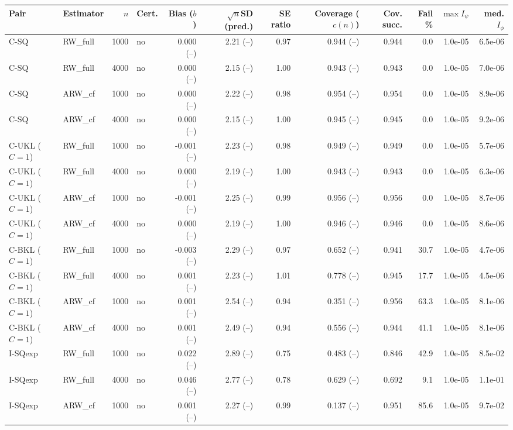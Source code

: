 \begin{tabular}{llrlrrrrrrrr}
\hline
Pair & Estimator & $n$ & Cert. & Bias ($b$) & $\sqrt{n}$SD (pred.) & SE ratio & Coverage ($c(n)$) & Cov. succ. & Fail \% & $\max I_\psi$ & med. $I_\phi$ \\
\hline
C-SQ & RW\_full & 1000 & no & 0.000 (--) & 2.21 (--) & 0.97 & 0.944 (--) & 0.944 & 0.0 & 1.0e-05 & 6.5e-06 \\
C-SQ & RW\_full & 4000 & no & 0.000 (--) & 2.15 (--) & 1.00 & 0.943 (--) & 0.943 & 0.0 & 1.0e-05 & 7.0e-06 \\
C-SQ & ARW\_cf & 1000 & no & 0.000 (--) & 2.22 (--) & 0.98 & 0.954 (--) & 0.954 & 0.0 & 1.0e-05 & 8.9e-06 \\
C-SQ & ARW\_cf & 4000 & no & 0.000 (--) & 2.15 (--) & 1.00 & 0.945 (--) & 0.945 & 0.0 & 1.0e-05 & 9.2e-06 \\
C-UKL ($C=1$) & RW\_full & 1000 & no & -0.001 (--) & 2.23 (--) & 0.98 & 0.949 (--) & 0.949 & 0.0 & 1.0e-05 & 5.7e-06 \\
C-UKL ($C=1$) & RW\_full & 4000 & no & 0.000 (--) & 2.19 (--) & 1.00 & 0.943 (--) & 0.943 & 0.0 & 1.0e-05 & 6.3e-06 \\
C-UKL ($C=1$) & ARW\_cf & 1000 & no & -0.001 (--) & 2.25 (--) & 0.99 & 0.956 (--) & 0.956 & 0.0 & 1.0e-05 & 8.7e-06 \\
C-UKL ($C=1$) & ARW\_cf & 4000 & no & 0.000 (--) & 2.19 (--) & 1.00 & 0.946 (--) & 0.946 & 0.0 & 1.0e-05 & 8.6e-06 \\
C-BKL ($C=1$) & RW\_full & 1000 & no & -0.003 (--) & 2.29 (--) & 0.97 & 0.652 (--) & 0.941 & 30.7 & 1.0e-05 & 4.7e-06 \\
C-BKL ($C=1$) & RW\_full & 4000 & no & 0.001 (--) & 2.23 (--) & 1.01 & 0.778 (--) & 0.945 & 17.7 & 1.0e-05 & 4.5e-06 \\
C-BKL ($C=1$) & ARW\_cf & 1000 & no & 0.001 (--) & 2.54 (--) & 0.94 & 0.351 (--) & 0.956 & 63.3 & 1.0e-05 & 8.1e-06 \\
C-BKL ($C=1$) & ARW\_cf & 4000 & no & 0.001 (--) & 2.49 (--) & 0.94 & 0.556 (--) & 0.944 & 41.1 & 1.0e-05 & 8.1e-06 \\
I-SQexp & RW\_full & 1000 & no & 0.022 (--) & 2.89 (--) & 0.75 & 0.483 (--) & 0.846 & 42.9 & 1.0e-05 & 8.5e-02 \\
I-SQexp & RW\_full & 4000 & no & 0.046 (--) & 2.77 (--) & 0.78 & 0.629 (--) & 0.692 & 9.1 & 1.0e-05 & 1.1e-01 \\
I-SQexp & ARW\_cf & 1000 & no & 0.001 (--) & 2.27 (--) & 0.99 & 0.137 (--) & 0.951 & 85.6 & 1.0e-05 & 9.7e-02 \\

\end{tabular}
